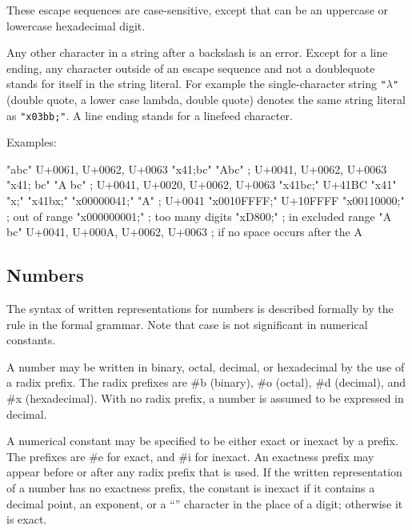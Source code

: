 These escape sequences are case-sensitive, except that  can be an uppercase or lowercase hexadecimal digit.

Any other character in a string after a backslash is an error. Except
for a line ending, any
character outside of an escape sequence and not a doublequote stands
for itself in the string literal. For example the single-character
string {\tt "$\lambda$"} (double quote, a lower case lambda, double
quote) denotes the same string literal as {\tt "\backwhack{}x03bb;"}.
A line ending stands for a linefeed character.

Examples:

\begin{schemenoindent}
"abc" \ev  \textrm{U+0061, U+0062, U+0063}
"\backwhack{}x41;bc" \ev  "Abc" ; \textrm{U+0041, U+0062, U+0063}
"\backwhack{}x41; bc" \ev "A bc"
\>\>; \textrm{U+0041, U+0020, U+0062, U+0063}
"\backwhack{}x41bc;" \ev  \textrm{U+41BC}
"\backwhack{}x41" \ev {}
"\backwhack{}x;" \ev {}
"\backwhack{}x41bx;" \ev {}
"\backwhack{}x00000041;" \ev  "A" ; \textrm{U+0041}
"\backwhack{}x0010FFFF;" \ev \textrm{U+10FFFF}
"\backwhack{}x00110000;" \ev  {}
\>\>; \textrm{out of range}
"\backwhack{}x000000001;" \ev {}
\>\>; \textrm{too many digits}
"\backwhack{}xD800;" \ev {}
\>\>; \textrm{in excluded range}
"A
bc" \ev \textrm{U+0041, U+000A, U+0062, U+0063}
\>\>; \textrm{if no space occurs after the {\cf{}A}}
\end{schemenoindent}
  
\subsection{Numbers}
\label{numbernotations}

The syntax of written representations for numbers is described
formally by the  rule in the formal grammar.  Note that
case is not significant in numerical constants.

A number may be written in binary, octal, decimal, or
hexadecimal by the use of a radix prefix.  The radix prefixes are {\cf
\#b} (binary), {\cf \#o} (octal), {\cf
\#d} (decimal), and {\cf \#x} (hexadecimal).  With
no radix prefix, a number is assumed to be expressed in decimal.

A
numerical constant may be specified to be either exact or
inexact by a prefix.  The prefixes are {\cf \#e}
for exact, and {\cf \#i} for inexact.  An exactness
prefix may appear before or after any radix prefix that is used.  If
the written representation of a number has no exactness prefix, the
constant is
inexact if it contains a decimal point, an
exponent, or a ``\sharpsign'' character in the place of a digit;
otherwise it is exact.

